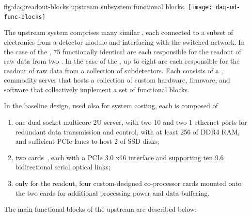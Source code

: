 \begin{dunefigure}{fig:daq:readout-blocks}{ upstream
     subsystem functional blocks.}
 \texttt{[image: daq-ud-func-blocks]}
\end{dunefigure}

The upstream  system comprises many similar , each
connected to a subset of electronics from a detector module and
interfacing with the  switched network. In the case of the
, 75 functionally identical  are each responsible for the readout of raw data from two
. In the case of the , up to eight  are each responsible for the
readout of raw data from a collection of  subdetectors. 
Each  consists of a , commodity server that hosts a
collection of custom hardware, 
firmware, and software that collectively implement a set of functional blocks.

In the baseline design, used also for system costing, each  is composed of
\begin{enumerate}
\item one dual socket multicore 2U server, with two \SI{10}{\Gbps} and two \SI{1}{\Gbps} ethernet ports for redundant data transmission and control, with at least \SI{256}{\GB} of DDR4 RAM, and sufficient PCIe lanes to host \SI{2}{\TB} of SSD disks;
\item two  cards~\cite{atlas-felix}, each with a PCIe 3.0 x16 interface and supporting ten \SI{9.6}{\Gbps} bidirectional serial optical links;
\item only for the  readout, four custom-designed co-processor cards mounted onto the two  cards for additional processing power and data buffering.

\end{enumerate}

The main functional blocks of the upstream  are described below:

